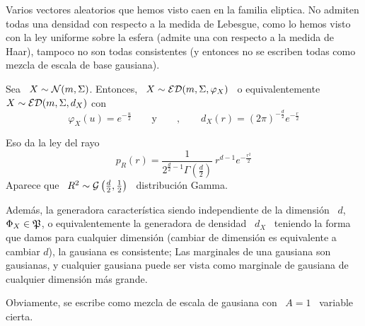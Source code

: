 Varios  vectores aleatorios que  hemos visto  caen en  la familia  eliptica.  No
admiten todas  una densidad con respecto a  la medida de Lebesgue,  como lo hemos
visto con la ley uniforme sobre la esfera (admite una con respecto a la medida de
Haar), tampoco no  son todas consistentes (y entonces no  se escriben todas como
mezcla de escala de base gausiana).
%
\begin{ejemplo}
%
  Sea \ $X \sim \mathcal{N}(m,\Sigma)$.  Entonces, \ $X \sim \mathcal{ED}(m,\Sigma,\varphi_X)$ \ o
  equivalentemente \ $X \sim \mathcal{ED}(m,\Sigma,d_X)$ con
  \[
  \varphi_X(u) =  e^{-\frac{u}{2}} \qquad \mbox{y}  \qquad , \qquad d_X(r)  = (2
  \pi)^{-\frac{d}{2}} e^{- \frac{r}{2}}
  \]
  
  Eso da la ley del rayo
  \[
  p_R(r)  =  \frac{1}{2^{\frac{d}{2}-1}  \Gamma\left(  \frac{d}{2}  \right)}  \:
  r^{d-1} e^{- \frac{r^2}{2}}
  \]
  Aparece   que  \   $R^2  \sim   \mathcal{G}\left(  \frac{d}{2}   ,   \frac12\right)$  \
  distribuci\'on Gamma.
  
  Adem\'as,   la  generadora   caracter\'istica  siendo   independiente   de  la
  dimensi\'on \  $d$, \  $\Phi_X \in \mathfrak{P}$,  o equivalentemente la  generadora de
  densidad  \ $d_X$ \  teniendo la  forma que  damos para  cualquier dimensi\'on
  (cambiar  de  dimensi\'on  es  equivalente  a cambiar  $d$),  la  gausiana  es
  consistente;  Las  marginales  de  una  gausiana son  gausianas,  y  cualquier
  gausiana puede ser  vista como marginale de gausiana  de cualquier dimensi\'on
  m\'as grande.

  Obviamente, se  escribe como  mezcla de  escala de gausiana  con \  $A =  1$ \
  variable cierta.
\end{ejemplo}

